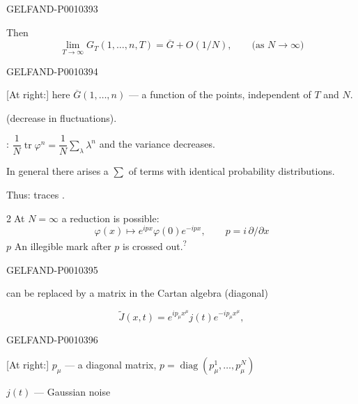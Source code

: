 \begin{GelfandAdjacentEvidence}{GELFAND-P001039}{3}


Then
\begin{equation*}
\lim_{T\to\infty}G_T(1,\ldots,n,T)=\overline G+O(1/N),
\qquad\text{(as }N\to\infty\text{)}
\tag{10}
\end{equation*}
\end{GelfandAdjacentEvidence}
\begin{GelfandAdjacentEvidence}{GELFAND-P001039}{4}


[At right:] here $\overline G(1,\ldots,n)$ --- a function of the points, independent of $T$ and $N$.

(decrease in fluctuations).

:
$\dfrac1N\operatorname{tr}\varphi^n=\dfrac1N\sum_\lambda\lambda^n$ and the variance decreases.

In general there arises a $\sum$ of terms with identical probability distributions.

Thus: traces .

\textcircled{2}\quad At $N=\infty$ a reduction is possible:
\begin{equation*}
\varphi(x)\longmapsto e^{ipx}\varphi(0)e^{-ipx},\qquad
p=i\,\partial/\partial x
\tag{11}
\end{equation*}
$p$ An illegible mark after \(p\) is crossed out.\textsuperscript{?}
\end{GelfandAdjacentEvidence}
\begin{GelfandAdjacentEvidence}{GELFAND-P001039}{5}

can be replaced by a matrix in the Cartan algebra (diagonal)

\begin{equation*}
\widetilde J(x,t)=e^{ip_\mu x^\mu}j(t)e^{-ip_\mu x^\mu},
\tag{12}
\end{equation*}
\end{GelfandAdjacentEvidence}
\begin{GelfandAdjacentEvidence}{GELFAND-P001039}{6}


[At right:] $p_\mu$ --- a diagonal matrix,
$p=\operatorname{diag}(p_\mu^1,\ldots,p_\mu^N)$

$j(t)$ --- Gaussian noise

\end{GelfandAdjacentEvidence}
